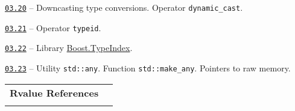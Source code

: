 \documentclass[a4paper,12pt]{article}
\renewenvironment{itemize}
{
    \begin{list}{\labelitemi}
    {
      \setlength{\topsep}{0pt}
      \setlength{\partopsep}{0pt}
      \setlength{\parskip}{0pt}
      \setlength{\itemsep}{0pt}
      \setlength{\parsep}{0pt}
      \setlength{\leftmargin}{14.5pt}
    }
}{\end{list}}
\begin{document}
\begin{itemize}

    \item \href{https://github.com/i-s-m-mipt/Education/blob/master/projects/examples/source/03.20.cpp}{\texttt{03.20}} -- Downcasting type conversions. Operator \lstinline{dynamic_cast}.

    \smallskip

    \item \href{https://github.com/i-s-m-mipt/Education/blob/master/projects/examples/source/03.21.cpp}{\texttt{03.21}} -- Operator \lstinline{typeid}.

    \smallskip

    \item \href{https://github.com/i-s-m-mipt/Education/blob/master/projects/examples/source/03.22.cpp}{\texttt{03.22}} -- Library \href{https://www.boost.org/doc/libs/1_84_0/doc/html/boost_typeindex.html}{Boost.TypeIndex}.

    \smallskip

    \item \href{https://github.com/i-s-m-mipt/Education/blob/master/projects/examples/source/03.23.cpp}{\texttt{03.23}} -- Utility \lstinline{std::any}. Function \lstinline{std::make_any}. Pointers to raw memory.

\end{itemize}

\bigskip\medskip

\begin{tabular}{!{\vrule width 1pt}L{3.6cm}!{\vrule width 1pt}L{15.4cm}!{\vrule width 0pt}} 


\textbf{Rvalue References} & \\


\end{tabular}

\medskip\smallskip
\end{document}
